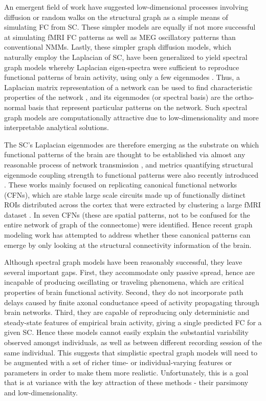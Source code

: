 An emergent field of work have suggested low-dimensional processes involving diffusion or random walks on the structural graph as a simple means of simulating FC from SC. These simpler models are equally if not more successful at simulating fMRI FC patterns \cite{abdelnour_network_2014, Atasoy2016} as well as MEG oscillatory patterns \cite{tewarie_how_2019, Raj2020} than conventional NMMs. Lastly, these simpler graph diffusion models, which naturally employ the Laplacian of SC, have been generalized to yield spectral graph models whereby Laplacian eigen-spectra were sufficient to reproduce functional patterns of brain activity, using only a few eigenmodes \cite{Abdelnour2018, Atasoy2016, Raj2020}. Thus, a Laplacian matrix representation of a network can be used to find characteristic properties of the network \cite{Stewart1999}, and its eigenmodes (or spectral basis) are the ortho-normal basis that represent particular patterns on the network. Such spectral graph models are computationally attractive due to low-dimensionality and more interpretable analytical solutions.

The SC's Laplacian eigenmodes are therefore emerging as the substrate on which functional patterns of the brain are thought to be established via almost any reasonable process of network transmission \cite{Abdelnour2018, Atasoy2016, robinson_eigenmodes_2016}, and metrics quantifying structural eigenmode coupling strength to functional patterns were also recently introduced \cite{preti_decoupling_2019}. These works mainly focused on replicating canonical functional networks (CFNs), which are stable large scale circuits made up of functionally distinct ROIs distributed across the cortex that were extracted by clustering a large fMRI dataset \cite{Yeo2011}. In \cite{Yeo2011} seven CFNs (these are spatial patterns, not to be confused for the entire network of graph of the connectome) were identified. Hence recent graph modeling work has attempted to address whether these canonical patterns can emerge by only looking at the structural connectivity information of the brain.

Although spectral graph models have been reasonably successful, they leave several important gaps. First, they accommodate only passive spread, hence are incapable of producing oscillating or traveling phenomena, which are critical properties of brain functional activity. Second, they do not incorporate path delays caused by finite axonal conductance speed of activity propagating through brain networks. Third, they are capable of reproducing only deterministic and steady-state features of empirical brain activity, giving a single predicted FC for a given SC. Hence these models cannot easily explain the substantial variability observed amongst individuals, as well as between different recording session of the same individual. This suggests that simplistic spectral graph models will need to be augmented with a set of richer time- or individual-varying features or parameters in order to make them more realistic. Unfortunately, this is a goal that is at variance with the key attraction of these methods - their parsimony and low-dimensionality.

